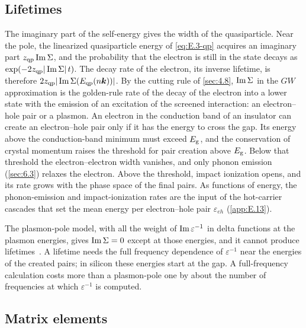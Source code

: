 \subsection{Lifetimes}

The imaginary part of the self-energy gives the width of the quasiparticle. Near the pole, the linearized quasiparticle energy of \cref{eq:E.3-qp} acquires an imaginary part $z_{\mathrm{qp}}\operatorname{Im}\Sigma$, and the probability that the electron is still in the state decays as $\exp(-2z_{\mathrm{qp}}|\operatorname{Im}\Sigma|\,t)$. The decay rate of the electron, its inverse lifetime, is therefore $2z_{\mathrm{qp}}|\operatorname{Im}\Sigma(E_{\mathrm{qp}}(n\bm{k}))|$. By the cutting rule of \cref{sec:4.8}, $\operatorname{Im}\Sigma$ in the $GW$ approximation is the golden-rule rate of the decay of the electron into a lower state with the emission of an excitation of the screened interaction: an electron--hole pair or a plasmon. An electron in the conduction band of an insulator can create an electron--hole pair only if it has the energy to cross the gap. Its energy above the conduction-band minimum must exceed $E_{\mathrm{g}}$, and the conservation of crystal momentum raises the threshold for pair creation above $E_{\mathrm{g}}$. Below that threshold the electron--electron width vanishes, and only phonon emission (\cref{sec:6.3}) relaxes the electron. Above the threshold, impact ionization opens, and its rate grows with the phase space of the final pairs. As functions of energy, the phonon-emission and impact-ionization rates are the input of the hot-carrier cascades that set the mean energy per electron--hole pair $\varepsilon_{eh}$ (\cref{app:E.13}).

The plasmon-pole model, with all the weight of $\operatorname{Im}\varepsilon^{-1}$ in delta functions at the plasmon energies, gives $\operatorname{Im}\Sigma = 0$ except at those energies, and it cannot produce lifetimes~\cite[Sect.~III\,C]{aryasetiawan1998gw}. A lifetime needs the full frequency dependence of $\varepsilon^{-1}$ near the energies of the created pairs; in silicon these energies start at the gap. A full-frequency calculation costs more than a plasmon-pole one by about the number of frequencies at which $\varepsilon^{-1}$ is computed.

\subsection{Matrix elements}

